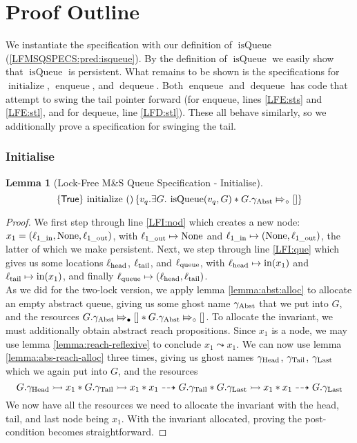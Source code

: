 \documentclass[a4paper, 10pt]{report}
\theoremstyle{definition}
\newtheorem{lemma}[theorem]{Lemma}
\newcommand{\initialise}{\operatorname{initialize}}
\newcommand{\enqueue}{\operatorname{enqueue}}
\newcommand{\dequeue}{\operatorname{dequeue}}
\newcommand{\msq}{M\&S Queue}
\newcommand{\lfmsq}{Lock-Free \msq{}}
\newcommand{\isqueue}{\operatorname{isQueue}}
\newcommand{\vq}{v_q}
\newcommand{\locinM}[1]{\loc_{#1\_\mathrm{in}}}
\newcommand{\locoutM}[1]{\loc_{#1\_\mathrm{out}}}
\newcommand{\locN}[1]{\loc_{\mathrm{#1}}}
\newcommand{\lochead}{\locN{head}}
\newcommand{\loctail}{\locN{tail}}
\newcommand{\locqueue}{\locN{queue}}
\newcommand{\nIn}[1]{\operatorname{in}(#1)}
\newcommand{\node}{x}
\newcommand{\nodeM}[1]{\node_{#1}}
\newcommand{\Qg}{G}
\newcommand{\gabst}{\gname_{\mathrm{Abst}}}
\newcommand{\ghead}{\gname_{\mathrm{Head}}}
\newcommand{\gtail}{\gname_{\mathrm{Tail}}}
\newcommand{\glast}{\gname_{\mathrm{Last}}}
\newcommand{\abstractstatefullfrag}[2]{#1 \Mapsto_{\circ} #2}
\newcommand{\abstractstateauth}[2]{#1 \Mapsto_{\bullet} #2}
\newcommand{\reach}[2]{#1 \leadsto #2}
\newcommand{\ar}[2]{#1 \dashrightarrow #2}
\newcommand{\ap}[2]{#1 \rightarrowtail #2}
\newcommand{\hocapspecinitHTGen}[2]{\hoare{\TRUE}{\initialise \ \TT}{#1 . \Exists #2 . \isqueue(#1, #2) \star{} \abstractstatefullfrag{#2.\gabst}{[]}}}
\newcommand{\hocapspecinitGen}[2]{\hocapspecinitHTGen{#1}{#2}}
\newcommand{\hocapspecinit}{\hocapspecinitGen{\vq}{\Qg}}
\begin{document}
\section{Proof Outline}
\label{LFMSQSPECS:section:proof-outline}

We instantiate the specification with our definition of $\isqueue$ (\ref{LFMSQSPECS:pred:isqueue}). By the definition of $\isqueue$ we easily show that $\isqueue$ is persistent. What remains to be shown is the specifications for $\initialise$, $\enqueue$, and $\dequeue$. Both $\enqueue$ and $\dequeue$ has code that attempt to swing the tail pointer forward (for enqueue, lines \ref{LFE:sts} and \ref{LFE:stl}, and for dequeue, line \ref{LFD:stl}). These all behave similarly, so we additionally prove a specification for swinging the tail.

\subsubsection{Initialise}
\begin{lemma}[\lfmsq{} Specification - Initialise]\label{LFMSQSPECS:spec:init}
  \begin{equation*}
    \hocapspecinit
  \end{equation*}
\end{lemma}
\begin{proof}
We first step through line \ref{LFI:nod} which creates a new node: $\nodeM{1} = (\locinM{1}, \None, \locoutM{1})$, with $\locoutM{1} \mapsto \None$ and $\locinM{1} \mapsto (\None, \locoutM{1})$, the latter of which we make persistent. Next, we step through line \ref{LFI:que} which gives us some locations $\lochead$, $\loctail$, and $\locqueue$, with $\lochead \mapsto \nIn{\nodeM{1}}$ and $\loctail \mapsto \nIn{\nodeM{1}}$, and finally $\locqueue \mapsto (\lochead, \loctail)$.\\
As we did for the two-lock version, we apply lemma \ref{lemma:abst:alloc} to allocate an empty abstract queue, giving us some ghost name $\gabst$ that we put into $\Qg$, and the resources $\abstractstateauth{\Qg.\gabst}{[]} \star{} \abstractstatefullfrag{\Qg.\gabst}{[]}$. To allocate the invariant, we must additionally obtain abstract reach propositions. Since $\nodeM{1}$ is a node, we may use lemma \ref{lemma:reach-reflexive} to conclude $\reach{\nodeM{1}}{\nodeM{1}}$. We can now use lemma \ref{lemma:abs-reach-alloc} three times, giving us ghost names $\ghead$, $\gtail$, $\glast$ which we again put into $\Qg$, and the resources
\begin{equation*}
  \ap{\Qg.\ghead}{\nodeM{1}} \star{} \ap{\Qg.\gtail}{\nodeM{1}} \star{} \ar{\nodeM{1}}{\Qg.\gtail} \star{} \ap{\Qg.\glast}{\nodeM{1}} \star{} \ar{\nodeM{1}}{\Qg.\glast}
\end{equation*}
We now have all the resources we need to allocate the invariant with the head, tail, and last node being $\nodeM{1}$. With the invariant allocated, proving the post-condition becomes straightforward.
\end{proof}
\end{document}
